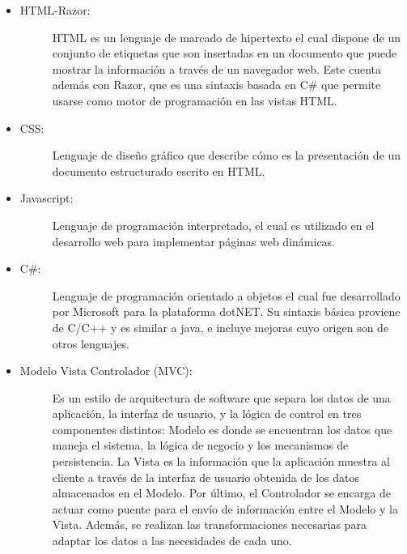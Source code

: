 \begin{itemize}
    \item   \begin{description}
                \item[HTML-Razor:] HTML es un lenguaje de marcado de hipertexto el cual dispone de un conjunto de etiquetas que son insertadas en un documento que puede mostrar la información a través de un navegador web. Este cuenta además con Razor, que es una sintaxis basada en C\# que permite usarse como motor de programación en las vistas HTML. 
            \end{description}

    \item   \begin{description}
                \item[CSS:] Lenguaje de diseño gráfico que describe cómo es la presentación de un documento estructurado escrito en HTML. 
            \end{description}

    \item   \begin{description}
                \item[Javascript:] Lenguaje de programación interpretado, el cual es utilizado en el desarrollo web para implementar páginas web dinámicas.
            \end{description}

    \item   \begin{description}
                \item[C\#:] Lenguaje de programación orientado a objetos el cual fue desarrollado por Microsoft para la plataforma dotNET. Su sintaxis básica proviene de C/C++ y es similar a java, e incluye mejoras cuyo origen son de otros lenguajes.
            \end{description}
    
    \item   \begin{description}
                \item[Modelo Vista Controlador (MVC):]   Es un estilo de arquitectura de software que separa los datos de una aplicación, la interfaz de usuario, y la lógica de control en tres componentes distintos: Modelo es donde se encuentran los datos que maneja el sistema, la lógica de negocio y los mecanismos de persistencia. La Vista es la información que la aplicación muestra al cliente a través de la interfaz de usuario obtenida de los datos almacenados en el Modelo. Por último, el Controlador se encarga de actuar como puente para el envío de información entre el Modelo y la Vista. Además, se realizan las transformaciones necesarias para adaptar los datos a las necesidades de cada uno.
            \end{description}
\end{itemize}
